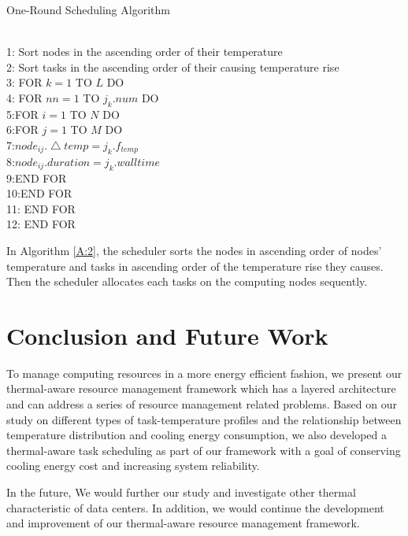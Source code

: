\begin{algorithm}
\caption{One-Round Scheduling Algorithm }
\label{A:2}
~\\
1:       Sort nodes in the ascending order of their temperature\\
2:       Sort tasks in the ascending order of their causing temperature rise\\
3:       FOR $k=1$  TO  $L$ DO\\
4: \BH         FOR $nn=1$ TO $j_k.num$ DO\\ 
5:\BH \BH    FOR $i =1$  TO  $N$ DO\\
6:\BH\BH\BH FOR $j =1$  TO  $M$ DO\\
7:\BH\BH\BH\BH  $node_{ij}.\bigtriangleup{temp}=j_k.f_{temp}$\\
8:\BH\BH\BH \BH $node_{ij}.duration=j_k.walltime$\\
9:\BH\BH\BH END FOR\\
10:\BH \BH    END FOR\\
11: \BH        END FOR\\
12:     END FOR\\          
\end{algorithm}

In Algorithm \ref{A:2}, the scheduler sorts the nodes in ascending order of nodes' temperature and tasks in ascending order of the temperature rise they causes. Then the scheduler allocates each tasks on the computing nodes sequently. 

\section{Conclusion and Future Work}
To manage computing resources in a more energy efficient fashion, we present our thermal-aware resource management framework which has a layered architecture and can address a series of resource management related problems. Based on our study on different types of task-temperature profiles and the relationship between temperature distribution and cooling energy consumption, we also developed a thermal-aware task scheduling as part of our framework with a goal of conserving cooling energy cost and increasing system reliability. 

In the future, We would further our study and investigate other thermal characteristic of data centers. In addition, we would continue the development and improvement of our thermal-aware resource management framework.